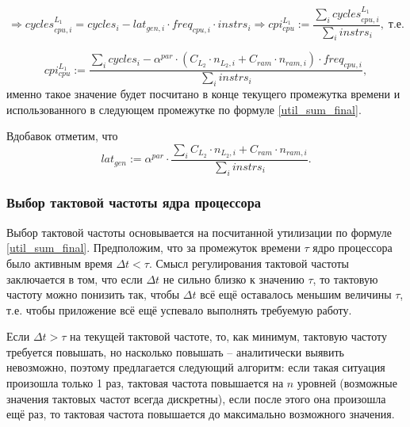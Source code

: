     \begin{equation*}
        \Rightarrow cycles_{cpu, i}^{L_1} = cycles_i - lat_{gen, i} \cdot freq_{cpu, i} \cdot instrs_i \Rightarrow
        cpi_{cpu}^{L_1} := \frac{\sum \limits_i cycles_{cpu, i}^{L_1}}{\sum \limits_i instrs_i}, \; \text{т.е.}
    \end{equation*}

    \begin{equation} \label{cpi_l1_sum}
        cpi_{cpu}^{L_1} := \frac{\sum \limits_i cycles_i - \alpha^{par} \cdot \left( C_{L_2} \cdot n_{L_2, i} +
            C_{ram} \cdot n_{ram, i} \right) \cdot freq_{cpu, i}}{\sum \limits_i instrs_i},
    \end{equation}
    именно такое значение будет посчитано в конце текущего промежутка времени и использованного в следующем
    промежутке по формуле \eqref{util_sum_final}.

    Вдобавок отметим, что
    \begin{equation} \label{latency_sum}
        lat_{gen} := \alpha^{par} \cdot \frac{\sum \limits_i C_{L_2} \cdot n_{L_2, i} + C_{ram} \cdot n_{ram, i}}
            {\sum \limits_i instrs_i}.
    \end{equation}

\subsubsection{Выбор тактовой частоты ядра процессора}

    Выбор тактовой частоты основывается на посчитанной утилизации по формуле \eqref{util_sum_final}.
    Предположим, что за промежуток времени $\tau$ ядро процессора было активным время $\Delta t < \tau$.
    Смысл регулирования тактовой частоты заключается в том, что если $\Delta t$ не сильно близко к
    значению $\tau$, то тактовую частоту можно понизить так, чтобы $\Delta t$ всё ещё оставалось меньшим
    величины $\tau$, т.е. чтобы приложение всё ещё успевало выполнять требуемую работу.

    Если $\Delta t > \tau$ на текущей тактовой частоте, то, как минимум, тактовую частоту требуется повышать,
    но насколько повышать -- аналитически выявить невозможно, поэтому предлагается следующий алгоритм:
    если такая ситуация произошла только 1 раз, тактовая частота повышается на $n$ уровней (возможные
    значения тактовых частот всегда дискретны), если после этого она произошла ещё раз, то тактовая частота
    повышается до максимально возможного значения.

